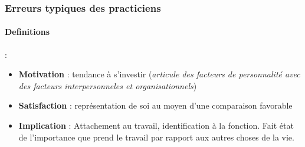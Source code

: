 \documentclass[11pt]{article} %
\begin{document}
\subsubsection{Erreurs typiques des practiciens}

\paragraph{Definitions} :
\begin{itemize}
 \item \textbf{Motivation} : tendance à s'investir (\textit{articule
         des facteurs de personnalité avec des facteurs
     interpersonneles et organisationnels})
 \item \textbf{Satisfaction} : représentation de soi au moyen d'une
     comparaison favorable
 \item \textbf{Implication} : Attachement au travail, identification à la
     fonction. Fait état de l'importance que prend le travail par rapport
     aux autres choses de la vie. 
\end{itemize}
\end{document}
